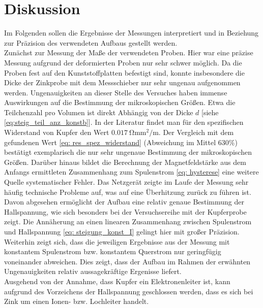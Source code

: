 \section{Diskussion}
Im Folgenden sollen die Ergebnisse der Messungen interpretiert und in Beziehung zur Präzision des verwendeten Aufbaus gestellt werden. \\
Zunächst zur Messung der Maße der verwendeten Proben. Hier war eine präzise Messung aufgrund der deformierten Proben nur sehr schwer möglich.
Da die Proben fest auf den Kunststoffplatten befestigt sind, konnte insbesondere die Dicke der Zinkprobe mit dem Messschieber nur sehr ungenau aufgenommen werden.
Ungenauigkeiten an dieser Stelle des Versuches haben immense Auswirkungen auf die Bestimmung der mikroskopischen Größen. Etwa die Teilchenzahl pro Volumen
ist direkt Abhängig von der Dicke $d$ [siehe \eqref{eq:steig_teil_anz_konstb}]. In der Literatur \cite{dem2} findet man für den spezifischen Widerstand von Kupfer den Wert $\SI{0.017}{\ohm \milli \meter^2 \per \meter}$. Der Vergleich %
mit dem gefundenen Wert \eqref{eq: res_spez_widerstand} (Abweichung im Mittel $630\%$) bestätigt exemplarisch die nur sehr ungenaue Bestimmung der mikroskopischen Größen.%
Darüber hinaus bildet die Berechnung der Magnetfeldstärke aus dem Anfangs ermittleten Zusammenhang zum Spulenstrom \eqref{eq: hysterese} eine weitere Quelle systematischer
Fehler. Das Netzgerät zeigte im Laufe der Messung sehr häufig technische Probleme auf, was auf eine Überhitzung zurück zu führen ist. \\
Davon abgesehen ermöglicht der Aufbau eine relativ genaue Bestimmung der Hallspannung, wie sich besonders bei der Versuchsereihe mit der Kupferprobe zeigt. Die Annäherung
an einen linearen Zusammenhang zwischen Spulenstrom und Hallspannung \eqref{eq: steigung_konst_I} gelingt hier mit großer Präzision. Weiterhin zeigt sich, dass die jeweiligen
Ergebnisse aus der Messung mit konstantem Spulenstrom bzw. konstantem Querstrom nur geringfügig voneinander abweichen. Dies zeigt, dass der Aufbau im Rahmen der erwähnten
Ungenauigkeiten relativ aussagekräftige Ergenisse liefert.\\
Ausgehend von der Annahme, dass Kupfer ein Elektronenleiter ist,
kann aufgrund des Vorzeichens der Hallspannung geschlossen werden, dass es sich bei Zink um einen Ionen- bzw. Lochleiter handelt. \\
